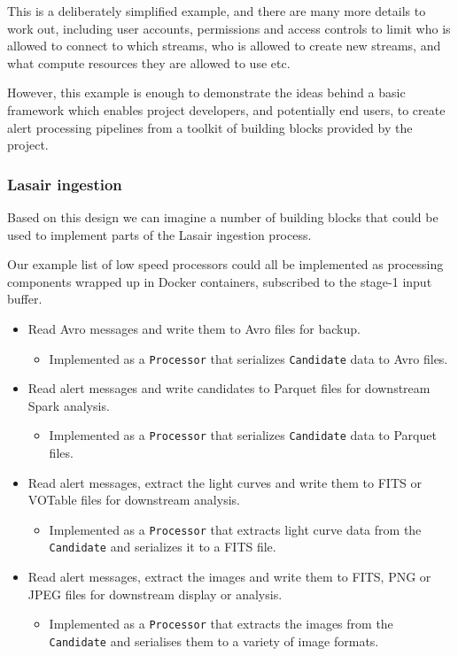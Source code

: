 \documentclass{article}
\newcommand{\avro} {Avro\xspace}
\newcommand{\fits} {FITS\xspace}
\newcommand{\png} {PNG\xspace}
\newcommand{\jpeg} {JPEG\xspace}
\newcommand{\parquet} {Parquet\xspace}
\newcommand{\votable} {VOTable\xspace}
\newcommand{\docker} {Docker\xspace}
\newcommand{\spark} {Spark\xspace}
\newcommand{\stageone} {stage-1\xspace}
\newcommand{\lasair} {Lasair\xspace}
\begin{document}
This is a deliberately simplified example, and there are many more details to work out, including user accounts, permissions and access controls to limit who is allowed to connect to which streams, who is allowed to create new streams, and what compute resources they are allowed to use etc.

However, this example is enough to demonstrate the ideas behind a basic framework which enables project developers, and potentially end users, to create alert processing pipelines from a toolkit of building blocks provided by the project.

\subsubsection{Lasair ingestion}
\label{workflow.lasair-ingestion}

Based on this design we can imagine a number of building blocks that could be used to implement parts of the \lasair ingestion process.

Our example list of low speed processors could all be implemented as processing components wrapped up in \docker containers, subscribed to the \stageone input buffer.

\begin{itemize}
  \item Read \avro messages and write them to \avro files for backup.
  \begin{itemize}
    \item Implemented as a \texttt{Processor} that serializes \texttt{Candidate} data to \avro files.
  \end{itemize}

  \item Read alert messages and write candidates to \parquet files for downstream \spark analysis.
  \begin{itemize}
    \item Implemented as a \texttt{Processor} that serializes \texttt{Candidate} data to \parquet files.
  \end{itemize}

  \item Read alert messages, extract the light curves and write them to \fits or \votable files for downstream analysis.
  \begin{itemize}
    \item Implemented as a \texttt{Processor} that extracts light curve data from the \texttt{Candidate} and serializes it to a \fits file.
  \end{itemize}

  \item Read alert messages, extract the images and write them to \fits, \png or \jpeg files for downstream display or analysis.
  
  \begin{itemize}
    \item Implemented as a \texttt{Processor} that extracts the images from the \texttt{Candidate} and serialises them to a variety of image formats.
  \end{itemize}
\end{itemize}
\end{document}
